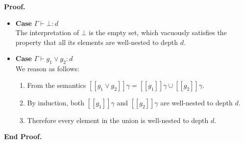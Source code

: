 \documentclass{article}
\newcommand{\lft}[1]{\left<{#1}\right.}
\newcommand{\rgt}[1]{\left.{#1}\right>}
\newcommand{\bnfalt}{\;\;|\;\;}
\newcommand{\judgebalance}[3][\Gamma]{{#1} \vdash {#2} : {#3}}
\newcommand{\interp}[1]{[\![{#1}]\!]}
\newenvironment{proof}{\noindent\textbf{Proof.}}
{\noindent\textbf{End Proof.}}
\newenvironment{caseblock}{\begin{itemize}}{\end{itemize}}
\newenvironment{case}[1]{\item \textbf{Case} {#1}\\}{}
\begin{document}
\begin{proof}
\begin{caseblock}
  \begin{case}{$\judgebalance{\bot}{d}$}
    The interpretation of $\bot$ is the empty set, which vacuously satisfies the property that
    all its elements are well-nested to depth $d$. 
  \end{case}

  \begin{case}{$\judgebalance{g_1 \vee g_2}{d}$}
    We reason as follows:
    \begin{enumerate}
      \item From the semantics $\interp{g_1 \vee g_2}\gamma = \interp{g_1}\gamma \cup \interp{g_2}\gamma$.
      \item By induction, both $\interp{g_1}\gamma$ and $\interp{g_2}\gamma$ are well-nested to depth $d$.
      \item Therefore every element in the union is well-nested to depth $d$. 
    \end{enumerate}
    
  \end{case}
\end{caseblock}

\end{proof}


% 
% 
% 
\end{document}
